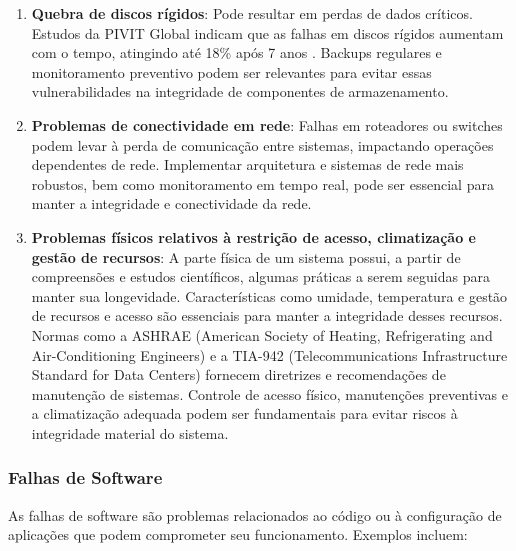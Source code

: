 \documentclass[12pt,oneside,a4paper,article]{abntex2}
\begin{document}
\begin{enumerate}
    \item \textbf{Quebra de discos rígidos}: Pode resultar em perdas de dados críticos. Estudos da PIVIT Global indicam que as falhas em discos rígidos aumentam com o tempo, atingindo até 18\% após 7 anos \cite{pivitglobal}. Backups regulares e monitoramento preventivo podem ser relevantes para evitar essas vulnerabilidades na integridade de componentes de armazenamento.
    
    \item \textbf{Problemas de conectividade em rede}: Falhas em roteadores ou switches podem levar à perda de comunicação entre sistemas, impactando operações dependentes de rede. Implementar arquitetura e sistemas de rede mais robustos, bem como monitoramento em tempo real, pode ser essencial para manter a integridade e conectividade da rede.
    
    \item \textbf{Problemas físicos relativos à restrição de acesso, climatização e gestão de recursos}: A parte física de um sistema possui, a partir de compreensões e estudos científicos, algumas práticas a serem seguidas para manter sua longevidade. Características como umidade, temperatura e gestão de recursos e acesso são essenciais para manter a integridade desses recursos. Normas como a ASHRAE (American Society of Heating, Refrigerating and Air-Conditioning Engineers) e a TIA-942 (Telecommunications Infrastructure Standard for Data Centers) fornecem diretrizes e recomendações de manutenção de sistemas. Controle de acesso físico, manutenções preventivas e a climatização adequada podem ser fundamentais para evitar riscos à integridade material do sistema.
\end{enumerate}


\subsubsection{Falhas de Software}

As falhas de software são problemas relacionados ao código ou à configuração de aplicações que podem comprometer seu funcionamento. Exemplos incluem:
\end{document}
